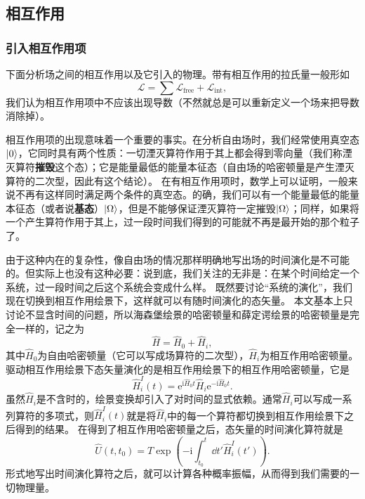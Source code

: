 \documentclass[hyperref, UTF8, a4paper]{ctexart}
\newcommand*{\ii}{\mathrm{i}}
\newcommand*{\ee}{\mathrm{e}}
\begin{document}
\subsection{相互作用}


\subsubsection{引入相互作用项}

下面分析场之间的相互作用以及它引入的物理。带有相互作用的拉氏量一般形如
\begin{equation}
    \mathcal{L} = \sum \mathcal{L}_\text{free} + \mathcal{L}_\text{int},
\end{equation}
我们认为相互作用项中不应该出现导数（不然就总是可以重新定义一个场来把导数消除掉）。

相互作用项的出现意味着一个重要的事实。在分析自由场时，我们经常使用真空态$\ket{0}$，它同时具有两个性质：一切湮灭算符作用于其上都会得到零向量（我们称湮灭算符\textbf{摧毁}这个态）；它是能量最低的能量本征态（自由场的哈密顿量是产生湮灭算符的二次型，因此有这个结论）。
在有相互作用项时，数学上可以证明，一般来说不再有这样同时满足两个条件的真空态。的确，我们可以有一个能量最低的能量本征态（或者说\textbf{基态}）$\ket{\Omega}$，但是不能够保证湮灭算符一定摧毁$\ket{\Omega}$；同样，如果将一个产生算符作用于其上，过一段时间我们得到的可能就不再是最开始的那个粒子了。

由于这种内在的复杂性，像自由场的情况那样明确地写出场的时间演化是不可能的。但实际上也没有这种必要：说到底，我们关注的无非是：在某个时间给定一个系统，过一段时间之后这个系统会变成什么样。
既然要讨论“系统的演化”，我们现在切换到相互作用绘景下，这样就可以有随时间演化的态矢量。
本文基本上只讨论不显含时间的问题，所以海森堡绘景的哈密顿量和薛定谔绘景的哈密顿量是完全一样的，记之为
\begin{equation}
    \hat{H} = \hat{H}_0 + \hat{H}_i,
\end{equation}
其中$\hat{H}_0$为自由哈密顿量（它可以写成场算符的二次型），$\hat{H}_i$为相互作用哈密顿量。
驱动相互作用绘景下态矢量演化的是相互作用绘景下的相互作用哈密顿量，它是
\begin{equation}
    \hat{H}_i^I(t) = \ee^{\ii \hat{H}_0 t} \hat{H}_i \ee^{- \ii \hat{H}_0 t}.
\end{equation}
虽然$\hat{H}_i$是不含时的，绘景变换却引入了对时间的显式依赖。通常$\hat{H}_i$可以写成一系列算符的多项式，则$\hat{H}_i^I(t)$就是将$\hat{H}_i$中的每一个算符都切换到相互作用绘景下之后得到的结果。
在得到了相互作用哈密顿量之后，态矢量的时间演化算符就是
\begin{equation}
    \hat{U}(t,t_0) = T\exp\left(-\ii \int_{t_0}^t \dd{t'} \hat{H}_i^I(t') \right).
\end{equation}
形式地写出时间演化算符之后，就可以计算各种概率振幅，从而得到我们需要的一切物理量。
\end{document}
